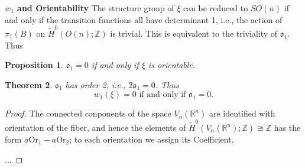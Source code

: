 \documentclass[12pt,a4paper]{article}
\newtheorem{theorem}{\indent Theorem}%
\newtheorem{proposition}[theorem]{\indent Proposition}
\theoremstyle{definition}
\newcommand{\mZ}{\mathbb{Z}}
\newcommand{\mR}{\mathbb{R}}
\begin{document}
\noindent\textbf{$w_1$ and Orientability}
The structure group of $\xi$ can be reduced to $SO(n)$ if and only if
the transition functions all have determinant 1, i.e., the action of 
$\pi_1(B)$ on $\tilde{H}^0(O(n);\mZ)$ is trivial. This is equivalent to
the triviality of $\mathfrak{o}_1$. Thus
\begin{proposition}
    $\mathfrak{o}_1 = 0$ if and only if $\xi$ is orientable.
\end{proposition}
\begin{theorem}
    $\mathfrak{o}_1$ has order 2, i.e., $2\mathfrak{o}_1 = 0$. Thus 
    \begin{equation*}
        w_1(\xi) = 0 \text{ if and only if } \mathfrak{o}_1 = 0.
    \end{equation*}
\end{theorem}
\begin{proof}
    The connected conponents of the space $V_n(\mR^n)$ are identified with 
    orientation of the fiber, and hence the elements of 
    $\tilde{H}^0(V_n(\mR^n);\mZ)\cong\mZ$ has the form 
    $a\mathrm{Or}_1-a\mathrm{Or}_2$; to each orientation we assign its 
    Coefficient.
    
    ...
\end{proof}
\end{document}
